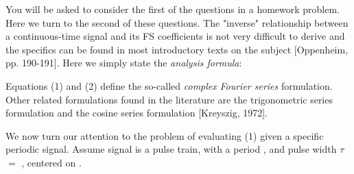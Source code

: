 \documentclass{article}
\begin{document}
\begin{CellGroup}
You will be asked to consider the first of the questions in a homework problem. Here we turn to the second of these questions. The "inverse" relationship
between a continuous-time signal and its FS coefficients is not very difficult to derive and the specifics can be found in most introductory texts
on the subject [Oppenheim, pp. 190-191]. Here we simply state the {\itshape analysis formula}:




Equations (1) and (2) define the so-called {\itshape complex} {\itshape Fourier series} formulation. Other related formulations found in the literature
are the trigonometric series formulation and the cosine series formulation [Kreyszig, 1972].



\begin{CellGroup}



\end{CellGroup}
We now turn our attention to the problem of evaluating (1) given a specific periodic signal. Assume signal  is a pulse train,
with a period , and pulse width  \(\tau \)\(=\) , centered on .



\begin{CellGroup}


\end{CellGroup}
\end{CellGroup}
\end{document}
